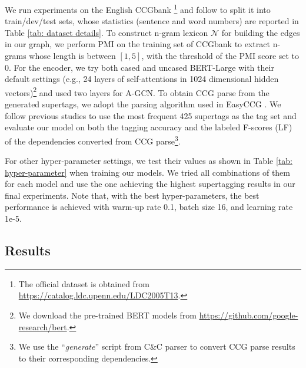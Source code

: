 \documentclass[11pt,a4paper]{article}
\begin{document}
We run experiments on the English CCGbank \cite{hockenmaier-steedman-2007-ccgbank}\footnote{The official dataset is obtained from \url{https://catalog.ldc.upenn.edu/LDC2005T13}.} and
follow \citet{clark-curran-2007-wide} to split it into train/dev/test sets,
whose statistics (sentence and word numbers) are reported in Table \ref{tab: dataset details}.
To construct n-gram lexicon $\mathcal{N}$ for building the edges in our graph, we perform 
PMI
on the training set of CCGbank to extract n-grams whose length is between $[1,5]$, with the threshold of the PMI score set to $0$.
For the encoder, we try both cased and uncased BERT-Large \cite{devlin-etal-2019-bert} with their default settings (e.g., 
24 layers of self-attentions in 1024 dimensional hidden vectors)\footnote{We download the pre-trained BERT models from \url{https://github.com/google-research/bert}.} and used two layers for A-GCN.
To obtain CCG parse from the generated supertags, we adopt the parsing algorithm used in EasyCCG \cite{lewis-steedman-2014-ccg}.
We follow previous studies \cite{lewis-steedman-2014-ccg, lewis-etal-2016-lstm, yoshikawa-etal-2017-ccg} to use the most frequent 425 supertags as the tag set and evaluate our model on both the tagging accuracy and the labeled F-scores (LF) of the dependencies converted from CCG parse\footnote{We use the ``\textit{generate}'' script from C\&C parser \cite{clark-curran-2007-wide} to convert CCG parse results to their corresponding dependencies.}.



For other hyper-parameter settings, we test their values as shown in
Table \ref{tab: hyper-parameter} when training our models.
We tried all combinations of them for each model and use the one achieving the highest supertagging results in our final experiments.
Note that, with the best hyper-parameters, the best performance is achieved with warm-up rate 0.1, batch size 16, and learning rate 1e-5.




\subsection{Results}
\end{document}

